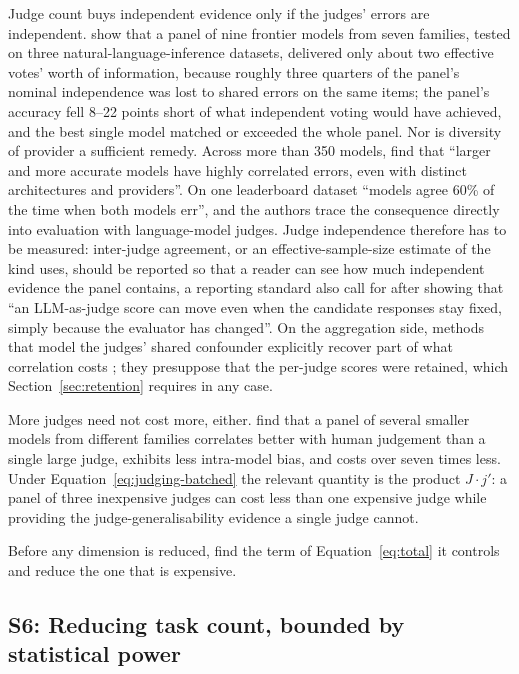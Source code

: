 \documentclass[11pt]{article}
\begin{document}
Judge count buys independent evidence only if the judges' errors are independent.
\citet{kohli2026ninejudges} show that a panel of nine frontier models from seven
families, tested on three natural-language-inference datasets, delivered only about two effective votes' worth of information, because
roughly three quarters of the panel's nominal independence was lost to shared errors on
the same items; the panel's accuracy fell 8--22 points short of what independent voting
would have achieved, and the best single model matched or exceeded the whole panel.
Nor is diversity of provider a sufficient remedy. Across more than 350 models,
\citet{kim2025correlated} find that ``larger and more accurate models have highly
correlated errors, even with distinct architectures and providers''. On one leaderboard dataset ``models agree 60\% of the time when both models err'', and the authors trace the consequence directly into evaluation with language-model judges. Judge independence therefore has to be measured: inter-judge agreement, or an effective-sample-size estimate of the
kind \citet{kohli2026ninejudges} uses, should be reported so that a reader can see how much independent evidence the panel contains, a reporting standard
\citet{yang2026judgechanges} also call for after showing that ``an LLM-as-judge score can
move even when the candidate responses stay fixed, simply because the evaluator has
changed''. On the aggregation side, methods that model the judges' shared confounder
explicitly recover part of what correlation costs \citep{zhao2026care}; they presuppose
that the per-judge scores were retained, which Section~\ref{sec:retention} requires in any
case.

More judges need not cost more, either. \citet{verga2024juries} find that a panel of several smaller models from different
families correlates better with human judgement than a single large judge, exhibits less
intra-model bias, and costs over seven times less. Under Equation~\ref{eq:judging-batched}
the relevant quantity is the product $J \cdot j'$: a panel of three inexpensive judges
can cost less than one expensive judge while providing the judge-generalisability evidence
a single judge cannot.

Before any dimension is reduced, find the term of Equation~\ref{eq:total} it controls and reduce the one that is expensive.

\subsection{S6: Reducing task count, bounded by statistical power}
\end{document}
